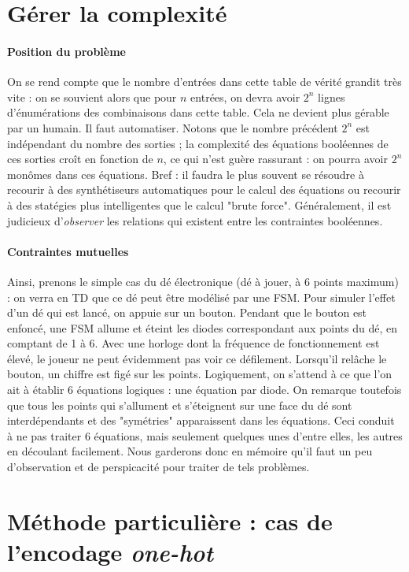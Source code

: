 \section{Gérer la complexité }
\paragraph{Position du problème}

On se rend compte que le nombre d'entrées dans cette table de vérité grandit très vite : on se souvient alors que pour $n$ entrées, on devra avoir $2^n$ lignes d'énumérations
des combinaisons dans cette table. Cela ne devient plus gérable par un humain. Il faut automatiser.
Notons que le nombre précédent $2^n$ est indépendant du nombre des sorties ; la complexité des équations booléennes de ces sorties croît en fonction de $n$, ce qui n'est guère
rassurant : on pourra  avoir $2^n$ monômes dans ces équations. Bref : il faudra le plus souvent se résoudre à recourir à des synthétiseurs automatiques pour le calcul des équations ou recourir à des statégies plus intelligentes
que le calcul "brute force". Généralement, il est judicieux d'{\it observer} les relations qui existent entre les contraintes booléennes.

\paragraph{Contraintes mutuelles}

Ainsi, prenons le simple cas du dé électronique (dé à jouer, à 6 points maximum) : on verra en TD que ce dé peut être modélisé par une FSM. Pour simuler l'effet d'un dé qui est lancé, on appuie
sur un bouton. Pendant que le bouton est enfoncé, une FSM allume et éteint les diodes correspondant aux points du dé, en comptant de 1 à 6.
Avec une horloge dont la fréquence de fonctionnement est élevé, le joueur ne peut évidemment pas voir ce défilement. Lorsqu'il relâche le bouton, un chiffre est figé sur les points.
Logiquement, on s'attend à ce que l'on ait à établir 6 équations logiques : une équation par diode. On remarque toutefois que tous les points qui s'allument et s'éteignent
sur une face du dé sont interdépendants et des "symétries" apparaissent dans les équations. Ceci conduit à ne pas traiter 6 équations, mais
seulement quelques unes d'entre elles, les autres en découlant facilement. Nous garderons donc en mémoire qu'il faut un peu d'observation et de perspicacité pour traiter de tels
problèmes.

\section{Méthode particulière : cas de l'encodage {\it one-hot}}

